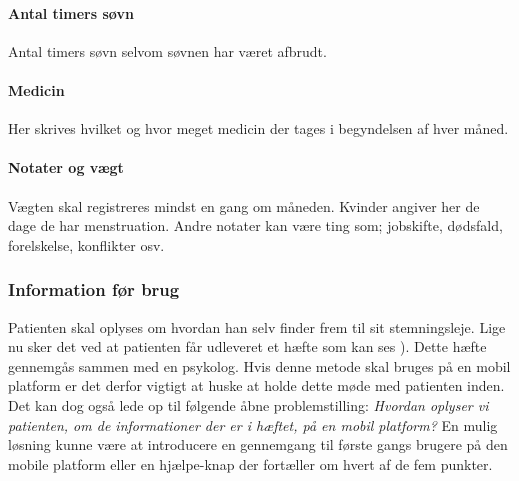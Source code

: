 \paragraph{Antal timers søvn}
Antal timers søvn selvom søvnen har været afbrudt.

\paragraph{Medicin}
Her skrives hvilket og hvor meget medicin der tages i begyndelsen af hver måned.

\paragraph{Notater og vægt} 
Vægten skal registreres mindst en gang om måneden.
Kvinder angiver her de dage de har menstruation.
Andre notater kan være ting som; jobskifte, dødsfald, forelskelse, konflikter osv.

\subsubsection{Information før brug}
Patienten skal oplyses om hvordan han selv finder frem til sit stemningsleje.
Lige nu sker det ved at patienten får udleveret et hæfte som kan ses \citet[Appendiks F, Stemningsregistrering]{faelles}).
Dette hæfte gennemgås sammen med en psykolog.
Hvis denne metode skal bruges på en mobil platform er det derfor vigtigt at huske at holde dette møde med patienten inden.
Det kan dog også lede op til følgende åbne problemstilling: \textit{Hvordan oplyser vi patienten, om de informationer der er i hæftet, på en mobil platform?}
En mulig løsning kunne være at introducere en gennemgang til første gangs brugere på den mobile platform eller en hjælpe-knap der fortæller om hvert af de fem punkter.
